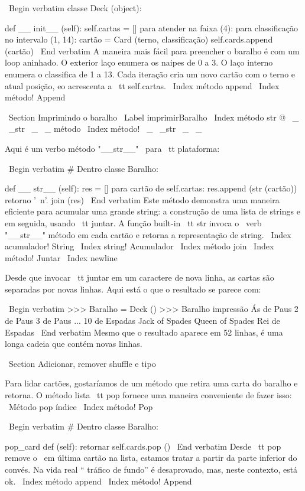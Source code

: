 \documentclass[10pt]{book}
\begin{document}
{{{{{{{{{{{{{{{{\ Begin {verbatim}
classe Deck (object):

    def __ init__ (self):
        self.cartas = []
        para atender na faixa (4):
            para classificação no intervalo (1, 14):
                cartão = Card (terno, classificação)
                self.cards.append (cartão)
\ End {verbatim}
%
A maneira mais fácil para preencher o baralho é com um loop aninhado. O exterior
laço enumera os naipes de 0 a 3. O laço interno enumera o
classifica de 1 a 13. Cada iteração
cria um novo cartão com o terno e atual posição,
eo acrescenta a {\ tt self.cartas}.
\ Index {método append}
\ Index {método! Append}


\ Section {Imprimindo o baralho}
\ Label {} imprimirBaralho
\ Index {método str @ \ _ \ _str \ _ \ _ método}
\ Index {método! \ _ \ _str \ _ \ _}

Aqui é um verbo método "__str__" \ para {\ tt plataforma}:

\ Begin {verbatim}
# Dentro classe Baralho:

    def __ str__ (self):
        res = []
        para cartão de self.cartas:
            res.append (str (cartão))
        retorno '\ n'. join (res)
\ End {verbatim}
%
Este método demonstra uma maneira eficiente para acumular uma grande
string: a construção de uma lista de strings e em seguida, usando {\ tt juntar}.
A função built-in {\ tt str} invoca o \ verb "__str__"
método em cada cartão e retorna a representação de string.
\ Index {acumulador! String}
\ Index {string! Acumulador}
\ Index {método join}
\ Index {método! Juntar}
\ Index {newline}

Desde que invocar {\ tt juntar} em um caractere de nova linha, as cartas
são separadas por novas linhas. Aqui está o que o resultado se parece com:

\ Begin {verbatim}
>>> Baralho = Deck ()
>>> Baralho impressão
Ás de Paus
2 de Paus
3 de Paus
...
10 de Espadas
Jack of Spades
Queen of Spades
Rei de Espadas
\ End {verbatim}
%
Mesmo que o resultado aparece em 52 linhas, é
uma longa cadeia que contém novas linhas.


\ Section {Adicionar, remover shuffle e tipo}

Para lidar cartões, gostaríamos de um método que
retira uma carta do baralho e retorna.
O método lista {\ tt pop} fornece uma maneira conveniente de fazer isso:
\ {Método pop} índice
\ Index {método! Pop}

\ Begin {verbatim}
# Dentro classe Baralho:

    pop_card def (self):
        retornar self.cards.pop ()
\ End {verbatim}
%
Desde {\ tt pop} remove o {\ em última} cartão na lista, estamos
tratar a partir da parte inferior do convés. Na vida real `` tráfico de fundo'' é
desaprovado,
mas, neste contexto, está ok.
\ Index {método append}
\ Index {método! Append}

}}}}}}}}}}}}}}}}
\end{document}
